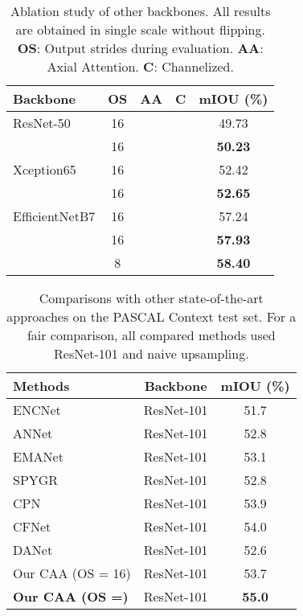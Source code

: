 \documentclass[letterpaper]{article} \usepackage{aaai22}  \usepackage{times}  \usepackage{helvet}  \usepackage{courier}  \usepackage[hyphens]{url}  \usepackage{graphicx} \urlstyle{rm} \def\UrlFont{\rm}  \usepackage{natbib}  \usepackage{caption} \DeclareCaptionStyle{ruled}{labelfont=normalfont,labelsep=colon,strut=off} \frenchspacing  \setlength{\pdfpagewidth}{8.5in}  \setlength{\pdfpageheight}{11in}  \usepackage{algorithm}
\begin{document}
\begin{table}[ht]
	\centering
	\small
	\begin{tabular}{l |c|c|c|c}
		\toprule
		Backbone 				   										& OS  	&AA   & C   & mIOU (\%)     \\
		\midrule[0.5pt]
		\midrule[0.5pt]
		ResNet-50
		& 16       	&\checkmark		    &              	& 49.73     \\
		~\cite{cResnet}& 16  	   	&\checkmark		    & \checkmark  	& \textbf{50.23}     \\
		\midrule
		Xception65
		& 16       	&\checkmark		    &              	& 52.42     \\
		~\cite{cXception}& 16  	   	&\checkmark		    & \checkmark  	& \textbf{52.65}     \\
		\midrule
		EfficientNetB7
		& 16       	&\checkmark		    &              	& 57.24     \\
		~\cite{cEfficientNet}& 16  	   	&\checkmark		    & \checkmark  	& \textbf{57.93}     \\
		& 8  	   	&\checkmark		    & \checkmark  	& \textbf{58.40}     \\         
		
		\bottomrule[0.5pt]
		
	\end{tabular}
	\caption{Ablation study of other backbones.
		All results are obtained in single scale without flipping.
		\textbf{OS}: Output strides during evaluation.
		\textbf{AA}: Axial Attention.
		\textbf{C}: Channelized.}
	\label{tabBackbones}
	
\end{table}

\begin{table}[ht]
	\centering
	\small
	\begin{tabular}{l|c|c}
		\toprule[1pt]
		\rule{0pt}{2ex} Methods & Backbone & mIOU (\%) \\
		\midrule[0.5pt]
		\midrule[0.5pt]
		ENCNet~\cite{cENCNet} & ResNet-101 & 51.7 \\
		ANNet~\cite{cANNN} & ResNet-101 & 52.8 \\
		EMANet~\cite{cEMANet} & ResNet-101 & 53.1 \\
		SPYGR~\cite{cSPYGR} & ResNet-101 & 52.8 \\
		CPN~\cite{cCPN} & ResNet-101 & 53.9 \\
		CFNet~\cite{cCFNet} & ResNet-101 & 54.0 \\
		\midrule[0.5pt]
		DANet~\cite{cDualAttention} & ResNet-101 & 52.6\\
		\midrule[0.5pt]
		Our CAA (OS = 16) & ResNet-101 & 53.7 \\
		\textbf{Our CAA (OS =\enspace8)} & ResNet-101 & \textbf{55.0} \\
		\bottomrule[1pt]
	\end{tabular}
	\caption{Comparisons with other state-of-the-art approaches on the PASCAL Context test set. For a fair comparison, all compared methods used ResNet-101 and naive upsampling.}
	\label{tabPascalContextSOTA}
\end{table}
\end{document}
